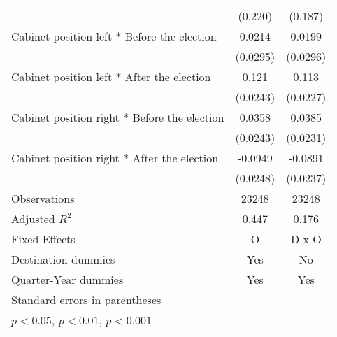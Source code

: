 \begin{table}[htbp]
\begin{tabular}{l*{2}{c}}
                    &     (0.220)         &     (0.187)         \\
[1em]
Cabinet position left * Before the election&      0.0214         &      0.0199         \\
                    &    (0.0295)         &    (0.0296)         \\
[1em]
Cabinet position left * After the election&       0.121\sym{***}&       0.113\sym{***}\\
                    &    (0.0243)         &    (0.0227)         \\
[1em]
Cabinet position right * Before the election&      0.0358         &      0.0385         \\
                    &    (0.0243)         &    (0.0231)         \\
[1em]
Cabinet position right * After the election&     -0.0949\sym{***}&     -0.0891\sym{***}\\
                    &    (0.0248)         &    (0.0237)         \\
\hline
Observations        &       23248         &       23248         \\
Adjusted \(R^{2}\)  &       0.447         &       0.176         \\
Fixed Effects       &           O         &       D x O         \\
Destination dummies &         Yes         &          No         \\
Quarter-Year dummies&         Yes         &         Yes         \\
\hline\hline
\multicolumn{3}{l}{\footnotesize Standard errors in parentheses}\\
\multicolumn{3}{l}{\footnotesize \sym{*} \(p<0.05\), \sym{**} \(p<0.01\), \sym{***} \(p<0.001\)}\\
\end{tabular}
\end{table}
